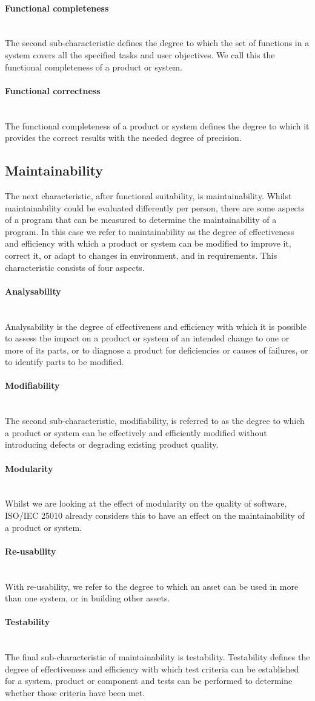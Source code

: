 \documentclass[twoside]{uva-inf-bachelor-thesis}
\newcommand{\myparagraph}[1]{\paragraph{#1}\mbox{}\\}
\begin{document}
\myparagraph{Functional completeness}
The second sub-characteristic defines the degree to which the set of functions in a system covers all the specified tasks and user objectives. We call this the functional completeness of a product or system.

\myparagraph{Functional correctness}
The functional completeness of a product or system defines the degree to which it provides the correct results with the needed degree of precision.

\subsection{Maintainability}
The next characteristic, after functional suitability, is maintainability. Whilst maintainability could be evaluated differently per person, there are some aspects of a program that can be measured to determine the maintainability of a program. In this case we refer to maintainability as the degree of effectiveness and efficiency with which a product or system can be modified to improve it, correct it, or adapt to changes in environment, and in requirements. This characteristic consists of four aspects.

\myparagraph{Analysability}
Analysability is the degree of effectiveness and efficiency with which it is possible to assess the impact on a product or system of an intended change to one or more of its parts, or to diagnose a product for deficiencies or causes of failures, or to identify parts to be modified.

\myparagraph{Modifiability}
The second sub-characteristic, modifiability, is referred to as the degree to which a product or system can be effectively and efficiently modified without introducing defects or degrading existing product quality.

\myparagraph{Modularity}
Whilst we are looking at the effect of modularity on the quality of software, ISO/IEC 25010 already considers this to have an effect on the maintainability of a product or system.

\myparagraph{Re-usability}
With re-usability, we refer to the degree to which an asset can be used in more than one system, or in building other assets.

\myparagraph{Testability}
The final sub-characteristic of maintainability is testability. Testability defines the degree of effectiveness and efficiency with which test criteria can be established for a system, product or component and tests can be performed to determine whether those criteria have been met.
\end{document}
